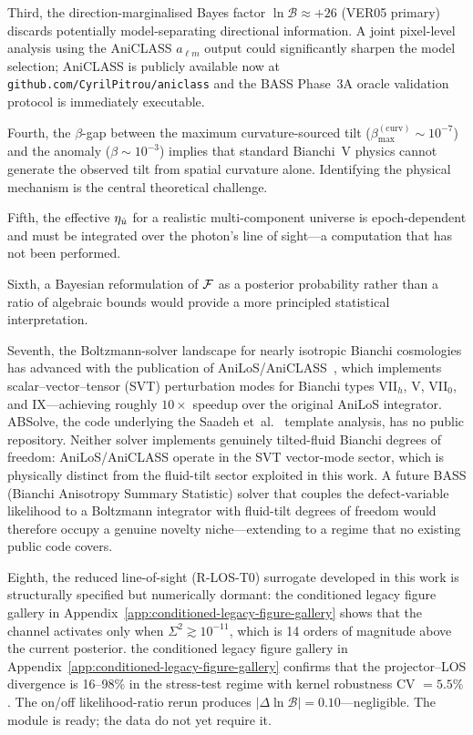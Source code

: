 Third, the direction-marginalised Bayes factor
$\ln\mathcal{B} \approx +26$ (VER05 primary) discards potentially
model-separating directional information.  A joint pixel-level
analysis using the AniCLASS $a_{\ell m}$ output could
significantly sharpen the model selection; AniCLASS is
publicly available now at
\texttt{github.com/CyrilPitrou/aniclass} and the BASS Phase~3A
oracle validation protocol is immediately executable.

Fourth, the $\beta$-gap between the maximum curvature-sourced
tilt ($\beta_{\max}^{(\mathrm{curv})} \sim 10^{-7}$) and the
anomaly ($\beta \sim 10^{-3}$) implies that standard Bianchi~V
physics cannot generate the observed tilt from spatial curvature
alone.  Identifying the physical mechanism is the central
theoretical challenge.

Fifth, the effective $\eta_{\dot{u}}$ for a realistic multi-component
universe is epoch-dependent and must be integrated over the
photon's line of sight---a computation that has not been
performed.

Sixth, a Bayesian reformulation of $\mathcal{F}$ as a posterior
probability rather than a ratio of algebraic bounds would
provide a more principled statistical interpretation.

Seventh, the Boltzmann-solver landscape for nearly isotropic
Bianchi cosmologies has advanced with the publication of
AniLoS/AniCLASS~\cite{Vicente2026}, which implements
scalar--vector--tensor (SVT) perturbation modes for
Bianchi types VII$_h$, V, VII$_0$, and IX---achieving roughly
$10\times$ speedup over the original AniLoS integrator.
ABSolve, the code underlying the Saadeh
et~al.~\cite{Saadeh2016b} template analysis, has no public
repository.  Neither solver implements genuinely tilted-fluid
Bianchi degrees of freedom: AniLoS/AniCLASS operate in the
SVT vector-mode sector, which is physically distinct from the
fluid-tilt sector exploited in this work.  A future BASS
(Bianchi Anisotropy Summary Statistic) solver that couples
the defect-variable likelihood to a Boltzmann integrator
with fluid-tilt degrees of freedom would therefore occupy a
genuine novelty niche---extending to a regime that no
existing public code covers.

Eighth, the reduced line-of-sight (R-LOS-T0) surrogate developed
in this work is structurally specified but numerically dormant:
the conditioned legacy figure gallery in Appendix~\ref{app:conditioned-legacy-figure-gallery} shows that the channel activates
only when $\Sigma^2 \gtrsim 10^{-11}$, which is 14 orders of
magnitude above the current posterior.
the conditioned legacy figure gallery in Appendix~\ref{app:conditioned-legacy-figure-gallery} confirms that the
projector--LOS divergence is 16--98\% in the stress-test regime
with kernel robustness CV $= 5.5\%$.  The on/off likelihood-ratio rerun
produces $|\Delta\ln\mathcal{B}| = 0.10$---negligible.  The
module is ready; the data do not yet require it.

